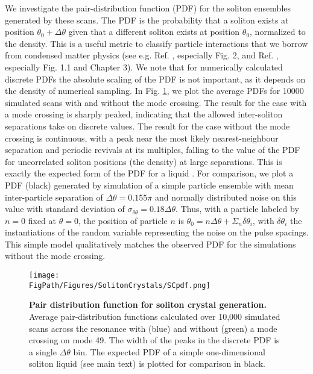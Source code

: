 We investigate the pair-distribution function (PDF) for the soliton ensembles generated by these scans. The PDF is the probability that a soliton exists at position $\theta_0+\Delta\theta$ given that a different soliton exists at position $\theta_0$, normalized to the density. This is a useful metric to classify particle interactions that we borrow from condensed matter physics (see e.g. Ref. \cite{Barker1976}, especially Fig. 2, and Ref. \cite{Egami2012}, especially Fig. 1.1 and Chapter 3). We note that for numerically calculated discrete PDFs the absolute scaling of the PDF is not important, as it depends on the density of numerical sampling. In Fig. \ref{fig:SCpdf}, we plot the average PDFs for 10000 simulated scans with and without the mode crossing. The result for the case with a mode crossing is sharply peaked, indicating that the allowed inter-soliton separations take on discrete values. The result for the case without the mode crossing is continuous, with a peak near the most likely nearest-neighbour separation and periodic revivals at its multiples, falling to the value of the PDF for uncorrelated soliton positions (the density) at large separations. This is exactly the expected form of the PDF for a liquid \cite{Barker1976,Egami2012}. For comparison, we plot a PDF (black) generated by simulation of a simple particle ensemble with mean inter-particle separation of $\Delta\theta=0.155\pi$ and normally distributed noise on this value with standard deviation of $\sigma_{\delta\theta}=0.18\Delta\theta$. Thus, with a particle labeled by $n = 0$ fixed at $\theta = 0$, the position of particle $n$ is $\theta_0 = n\Delta\theta + \Sigma_n\delta\theta_i$, with $\delta\theta_i$ the instantiations of the random variable representing the noise on the pulse spacings. This simple model qualitatively matches the observed PDF for the simulations without the mode crossing.

\begin{figure}[htpb]
	\begin{center}
		\texttt{[image: \\FigPath/Figures/SolitonCrystals/SCpdf.png]}
	\end{center}
	\caption[Pair distribution function for soliton crystal generation]{\textbf{Pair distribution function for soliton crystal generation.} Average pair-distribution functions calculated over 10,000 simulated scans across the resonance with (blue) and without (green) a mode crossing on mode 49. The width of the peaks in the discrete PDF is a single $\Delta\theta$ bin. The expected PDF of a simple one-dimensional soliton liquid (see main text) is plotted for comparison in black.}
	\label{fig:SCpdf}
\end{figure} 


